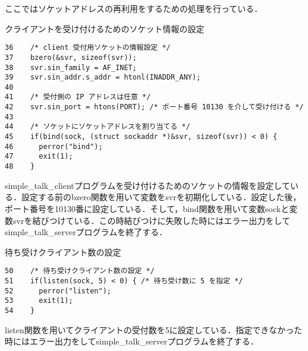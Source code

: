 \documentclass[a4j]{jarticle}
\newenvironment{bit}{\begin{breakitembox}}{\end{breakitembox}} %
\newcommand{\sts}{simple\_talk\_serverプログラム}
\newcommand{\stc}{simple\_talk\_clientプログラム}
\begin{document}
ここではソケットアドレスの再利用をするための処理を行っている．

\begin{bit}[l]{クライアントを受け付けるためのソケット情報の設定}
\begin{verbatim}
36	  /* client 受付用ソケットの情報設定 */
37	  bzero(&svr, sizeof(svr));
38	  svr.sin_family = AF_INET;
39	  svr.sin_addr.s_addr = htonl(INADDR_ANY);
40
41	  /* 受付側の IP アドレスは任意 */
42	  svr.sin_port = htons(PORT); /* ポート番号 10130 を介して受け付ける */
43
44	  /* ソケットにソケットアドレスを割り当てる */
45	  if(bind(sock, (struct sockaddr *)&svr, sizeof(svr)) < 0) {
46	    perror("bind");
47	    exit(1);
48	  }
\end{verbatim}
\end{bit}

\stc を受け付けるためのソケットの情報を設定している．設定する前のbzero関数を用いて変数をsvrを初期化している．設定した後，ポート番号を10130番に設定している．そして，bind関数を用いて変数sockと変数svrを結びつけている．この時結びつけに失敗した時にはエラー出力をして\sts を終了する．

\begin{bit}[l]{待ち受けクライアント数の設定}
\begin{verbatim}
50	  /* 待ち受けクライアント数の設定 */
51	  if(listen(sock, 5) < 0) { /* 待ち受け数に 5 を指定 */
52	    perror("listen");
53	    exit(1);
54	  }
\end{verbatim}
\end{bit}

listen関数を用いてクライアントの受付数を5に設定している．指定できなかった時にはエラー出力をして\sts を終了する．
\end{document}
